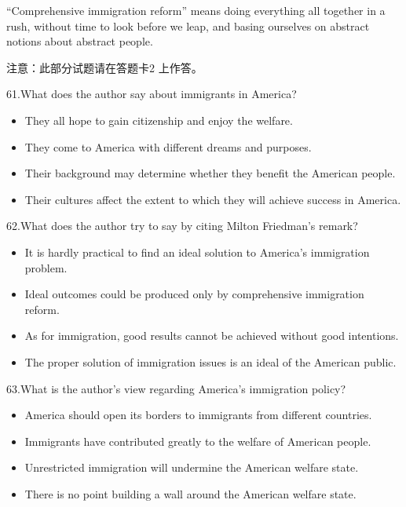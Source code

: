 \documentclass[UTF8,11pt]{ctexart}
\begin{document}
“Comprehensive immigration reform” means doing everything all together in a rush, without time to look before we leap, and basing ourselves on abstract notions about abstract people.


注意：此部分试题请在答题卡2 上作答。


61.What does the author say about immigrants in America?


\begin{itemize}[leftmargin=2em,itemsep=.2em,topsep=.4em]\item[A.] They all hope to gain citizenship and enjoy the welfare.
\item[B.] They come to America with different dreams and purposes.
\item[C.] Their background may determine whether they benefit the American people.
\item[D.] Their cultures affect the extent to which they will achieve success in America.
\end{itemize}

62.What does the author try to say by citing Milton Friedman’s remark?


\begin{itemize}[leftmargin=2em,itemsep=.2em,topsep=.4em]\item[A.] It is hardly practical to find an ideal solution to America’s immigration problem.
\item[B.] Ideal outcomes could be produced only by comprehensive immigration reform.
\item[C.] As for immigration, good results cannot be achieved without good intentions.
\item[D.] The proper solution of immigration issues is an ideal of the American public.
\end{itemize}

63.What is the author’s view regarding America’s immigration policy?


\begin{itemize}[leftmargin=2em,itemsep=.2em,topsep=.4em]\item[A.] America should open its borders to immigrants from different countries.
\item[B.] Immigrants have contributed greatly to the welfare of American people.
\item[C.] Unrestricted immigration will undermine the American welfare state.
\item[D.] There is no point building a wall around the American welfare state.
\end{itemize}
\end{document}

